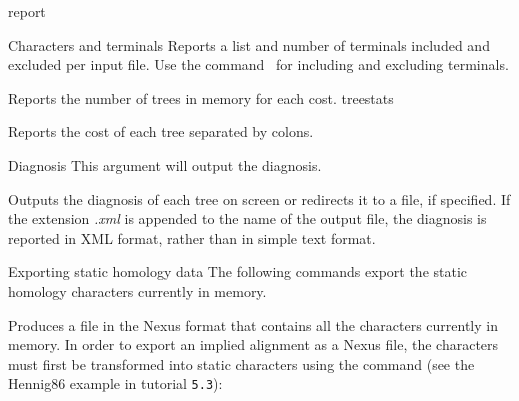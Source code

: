 \begin{command}{report}{}
\begin{arguments}
\begin{argumentgroup}{Characters and terminals}
                {Reports a list and number of terminals included and excluded
                per input file. Use the command~ for including and excluding
                terminals.}
                {}

                {Reports the number of trees in memory for each cost.}
                {treestats}

                {Reports the cost of each tree separated by colons.}
                {}

		\end{argumentgroup}

		\begin{argumentgroup}{Diagnosis}
			{This argument will output the diagnosis.} 

                {Outputs the diagnosis of each tree on screen or redirects it to a file, if
                specified. If the extension \emph{.xml} is appended to the name of the
                output file, the diagnosis is reported in XML format, rather than in
                simple text format.} 
                {}

		\end{argumentgroup} 
		
 	     \begin{argumentgroup}{Exporting static homology data}
            {The following commands export the static homology characters
            currently in memory.}

                {Produces a file in the Nexus format that contains all the
                characters currently in memory.  In
                order to export an implied alignment as a Nexus file, the
                characters must first be transformed into static characters
                using the  command (see the Hennig86 
                example in tutorial \texttt{5.3}): 
                \begin{flushleft}
                     \\
                \end{flushleft}}
                {}
                

\end{argumentgroup}
\end{arguments}
\end{command}
